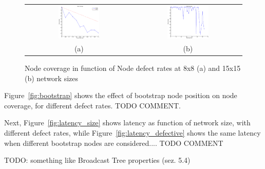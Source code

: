 \begin{figure}
  \centering
  \begin{tabular}{cc}
    \includegraphics[width=0.40\textwidth]{pictures/set1.eps} & 
    \includegraphics[width=0.40\textwidth]{pictures/set3.eps} \\
    (a) & (b)
  \end{tabular}
  \caption{Node coverage in function of Node defect rates at 8x8 (a) and 15x15 (b) network sizes}
  \label{fig:coverage}
\end{figure}

Figure~\ref{fig:bootstrap} shows the effect of bootstrap node position
on node coverage, for different defect rates. TODO COMMENT.



Next, Figure~\ref{fig:latency_size} shows latency as function of
network size, with different defect rates, while Figure~\ref{fig:latency_defective}
shows the same latency when different bootstrap nodes are
considered.... TODO COMMENT

TODO: something like Broadcast Tree properties (sez.  5.4)

